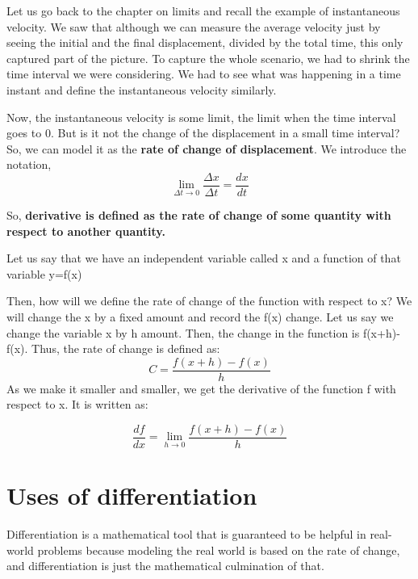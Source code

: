 Let us go back to the chapter on limits and recall the example of instantaneous velocity. We saw that although we can measure the average velocity just by seeing the initial and the final displacement, divided by the total time, this only captured part of the picture. To capture the whole scenario, we had to shrink the time interval we were considering. We had to see what was happening in a time instant and define the instantaneous velocity similarly.

Now, the instantaneous velocity is some limit, the limit when the time interval goes to 0. But is it not the change of the displacement in a small time interval? So, we can model it as the \textbf{rate of change of displacement}. We introduce the notation, 
$$\lim_{\Delta t \to 0} \frac{\Delta x}{\Delta t} = \frac{dx}{dt}$$

So, \textbf{derivative is defined as the rate of change of some quantity with respect to another quantity. }


\begin{outline}
    Let us say that we have an independent variable called x and a function of that variable y=f(x)

    Then, how will we define the rate of change of the function with respect to x? We will change the x by a fixed amount and record the f(x) change. Let us say we change the variable x by h amount. Then, the change in the function is f(x+h)-f(x). Thus, the rate of change is defined as:
    $$C = \frac{f(x+h)-f(x)}{h}$$
    As we make it smaller and smaller, we get the derivative of the function f with respect to x. It is written as: 

    $$\frac{df}{dx} = \lim_{h \to 0}\frac{f(x+h)-f(x)}{h}$$
    
\end{outline}


\section{Uses of differentiation}

Differentiation is a mathematical tool that is guaranteed to be helpful in real-world problems because modeling the real world is based on the rate of change, and differentiation is just the mathematical culmination of that. 

